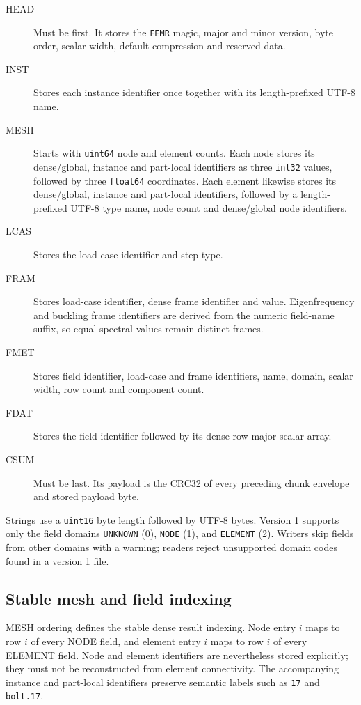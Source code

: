 \begin{description}
  \item[HEAD] Must be first. It stores the \texttt{FEMR} magic, major and minor version, byte order, scalar width, default compression and reserved data.
  \item[INST] Stores each instance identifier once together with its length-prefixed UTF-8 name.
  \item[MESH] Starts with \texttt{uint64} node and element counts. Each node stores its dense/global, instance and part-local identifiers as three \texttt{int32} values, followed by three \texttt{float64} coordinates. Each element likewise stores its dense/global, instance and part-local identifiers, followed by a length-prefixed UTF-8 type name, node count and dense/global node identifiers.
  \item[LCAS] Stores the load-case identifier and step type.
  \item[FRAM] Stores load-case identifier, dense frame identifier and value. Eigenfrequency and buckling frame identifiers are derived from the numeric field-name suffix, so equal spectral values remain distinct frames.
  \item[FMET] Stores field identifier, load-case and frame identifiers, name, domain, scalar width, row count and component count.
  \item[FDAT] Stores the field identifier followed by its dense row-major scalar array.
  \item[CSUM] Must be last. Its payload is the CRC32 of every preceding chunk envelope and stored payload byte.
\end{description}

Strings use a \texttt{uint16} byte length followed by UTF-8 bytes. Version 1 supports only the field domains \texttt{UNKNOWN} (0), \texttt{NODE} (1), and \texttt{ELEMENT} (2). Writers skip fields from other domains with a warning; readers reject unsupported domain codes found in a version 1 file.

\subsection{Stable mesh and field indexing}

MESH ordering defines the stable dense result indexing. Node entry $i$ maps to row $i$ of every NODE field, and element entry $i$ maps to row $i$ of every ELEMENT field. Node and element identifiers are nevertheless stored explicitly; they must not be reconstructed from element connectivity. The accompanying instance and part-local identifiers preserve semantic labels such as \texttt{17} and \texttt{bolt.17}.

